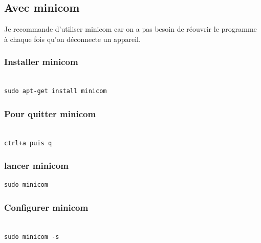 \documentclass{article}
\begin{document}
\subsection{Avec minicom}
Je recommande d'utiliser minicom car on a pas besoin de réouvrir le programme à chaque fois qu'on déconnecte un appareil.

\subsubsection{Installer minicom}
\begin{verbatim}

sudo apt-get install minicom

\end{verbatim}

\subsubsection{Pour quitter minicom}


\begin{verbatim}

ctrl+a puis q
\end{verbatim}

\subsubsection{lancer minicom}
\begin{verbatim}
sudo minicom

\end{verbatim}


\subsubsection{Configurer minicom}
\begin{verbatim}

sudo minicom -s
\end{verbatim}
\end{document}
